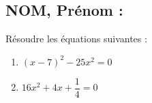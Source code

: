 \documentclass[a4paper,11pt,exos]{nsi}
\begin{document}
\subsection*{NOM, Prénom : \dotfill} 


\maketitle




\begin{exercice}
    Résoudre les équations suivantes :
    \begin{multicols}{2}
        \begin{enumerate}
            \item $(x-7)^2-25x^2=0$
	        \item $16x^2+4x+\dfrac{1}{4}=0$
        \end{enumerate}
    \end{multicols}
    
\end{exercice}

\end{document}
